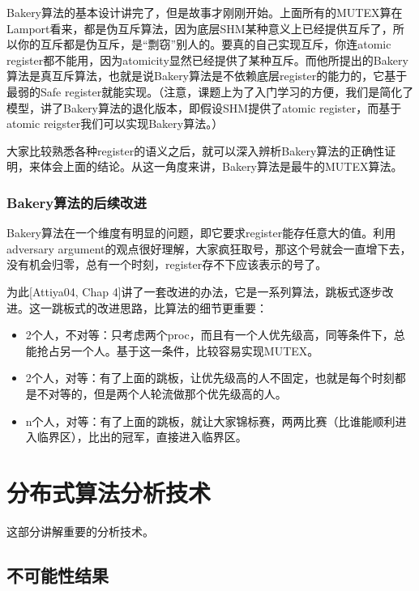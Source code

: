 \documentclass[UTF8]{ctexrep}
\begin{document}
Bakery算法的基本设计讲完了，但是故事才刚刚开始。上面所有的MUTEX算在Lamport看来，都是伪互斥算法，因为底层SHM某种意义上已经提供互斥了，所以你的互斥都是伪互斥，是“剽窃”别人的。要真的自己实现互斥，你连atomic register都不能用，因为atomicity显然已经提供了某种互斥。而他所提出的Bakery算法是真互斥算法，也就是说Bakery算法是不依赖底层register的能力的，它基于最弱的Safe register就能实现。（注意，课题上为了入门学习的方便，我们是简化了模型，讲了Bakery算法的退化版本，即假设SHM提供了atomic register，而基于atomic reigster我们可以实现Bakery算法。）

大家比较熟悉各种register的语义之后，就可以深入辨析Bakery算法的正确性证明，来体会上面的结论。从这一角度来讲，Bakery算法是最牛的MUTEX算法。

\section{Bakery算法的后续改进}

Bakery算法在一个维度有明显的问题，即它要求register能存任意大的值。利用adversary argument的观点很好理解，大家疯狂取号，那这个号就会一直增下去，没有机会归零，总有一个时刻，register存不下应该表示的号了。

为此[Attiya04, Chap 4]讲了一套改进的办法，它是一系列算法，跳板式逐步改进。这一跳板式的改进思路，比算法的细节更重要：

\begin{itemize}
    \item 2个人，不对等：只考虑两个proc，而且有一个人优先级高，同等条件下，总能抢占另一个人。基于这一条件，比较容易实现MUTEX。
    
    \item 2个人，对等：有了上面的跳板，让优先级高的人不固定，也就是每个时刻都是不对等的，但是两个人轮流做那个优先级高的人。
    
    \item n个人，对等：有了上面的跳板，就让大家锦标赛，两两比赛（比谁能顺利进入临界区），比出的冠军，直接进入临界区。
\end{itemize}


\part{分布式算法分析技术}

这部分讲解重要的分析技术。

\chapter{不可能性结果}
\end{document}
